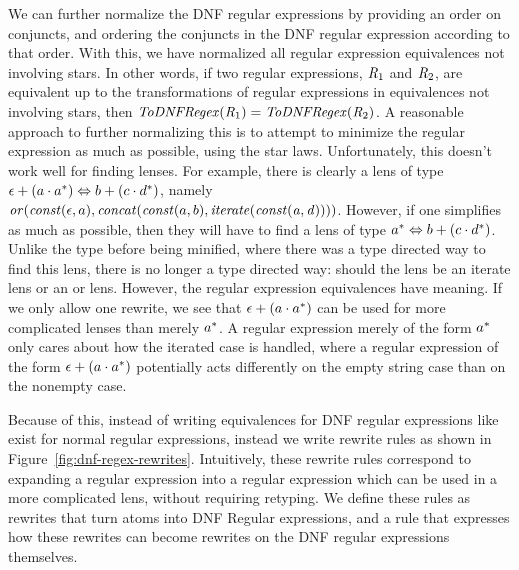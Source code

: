 We can further normalize the DNF regular expressions by providing an order on conjuncts,
and ordering the conjuncts in the DNF regular expression according to that order.
With this, we have normalized all regular expression equivalences not involving stars.
In other words, if two regular expressions, $\mathit{R}_1$ and $\mathit{R}_2$,
are equivalent up to the transformations of regular expressions in equivalences
not involving stars,
then $\mathit{ToDNFRegex}(\mathit{R}_1)=\mathit{ToDNFRegex}(\mathit{R}_2)$.
A reasonable approach to further normalizing this is to attempt to minimize the
regular expression as much as possible, using the star laws.
Unfortunately, this doesn't work
well for finding lenses.  For example, there is clearly a lens of type
$\epsilon+(a\cdot a^*) \Leftrightarrow b+(c\cdot d^*)$,
namely $\mathit{or}(\mathit{const}(\epsilon,a),\mathit{concat}(\mathit{const}(a,b),\mathit{iterate(\mathit{const}(a,d))}))$.
However, if one simplifies as much as possible, then they will have to find a lens
of type $a^* \Leftrightarrow b+(c\cdot d^*)$.
Unlike the type before being minified, where there was a type directed way to find
this lens, there is no longer a type directed way: should the lens be an iterate lens
or an or lens.
However, the regular expression equivalences have meaning.
If we only allow one rewrite, we see that
$\epsilon+(a\cdot a^*)$ can be used for more
complicated lenses than merely $a^*$.
A regular expression merely of the form $a^*$ only cares about how the iterated case is handled, where a regular expression of the form
$\epsilon+(a\cdot a^*)$ potentially acts differently on the empty
string case than on the nonempty case.


Because of this, instead of writing equivalences for DNF regular expressions like
exist for normal regular expressions,
instead we write rewrite rules as shown in
Figure~\ref{fig:dnf-regex-rewrites}.
Intuitively, these rewrite rules correspond to expanding a regular expression
into a regular expression which can be used in a more complicated lens, without requiring retyping.
We define these rules as rewrites that turn atoms into DNF Regular expressions,
and a rule that expresses how these rewrites can become rewrites on
the DNF regular expressions themselves.  

